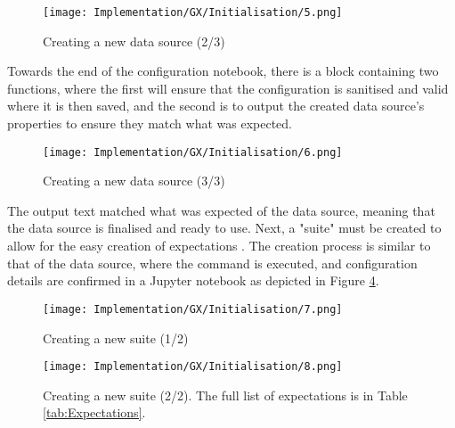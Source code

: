 \begin{figure}[H]
    \centering
    \texttt{[image: Implementation/GX/Initialisation/5.png]}
    \caption{Creating a new data source (2/3)}
    \label{fig:GXDatasource2}
\end{figure}

\para Towards the end of the configuration notebook, there is a block containing two functions, where the first 
will ensure that the configuration is sanitised and valid where it is then saved, and the second is to output the created 
data source's properties to ensure they match what was expected.

\begin{figure}[H]
    \centering
    \texttt{[image: Implementation/GX/Initialisation/6.png]}
    \caption{Creating a new data source (3/3)}
    \label{fig:GXDatasource3}
\end{figure}

\para The output text matched what was expected of the data source, meaning that the data source is finalised
and ready to use. Next, a "suite" must be created to allow for the easy creation of expectations \autocite{gx_expectation_nodate}.
The creation process is similar to that of the data source, where the command is executed, and configuration details are confirmed in 
a Jupyter notebook as depicted in Figure \ref{fig:GXSuite2}.

\begin{figure}[H]
    \centering
    \texttt{[image: Implementation/GX/Initialisation/7.png]}
    \caption{Creating a new suite (1/2)}
    \label{fig:GXSuite1}
\end{figure}

\begin{figure}[H]
    \centering
    \texttt{[image: Implementation/GX/Initialisation/8.png]}
    \caption{Creating a new suite (2/2). The full list of expectations is in Table \ref{tab:Expectations}.}
    \label{fig:GXSuite2}
\end{figure}

